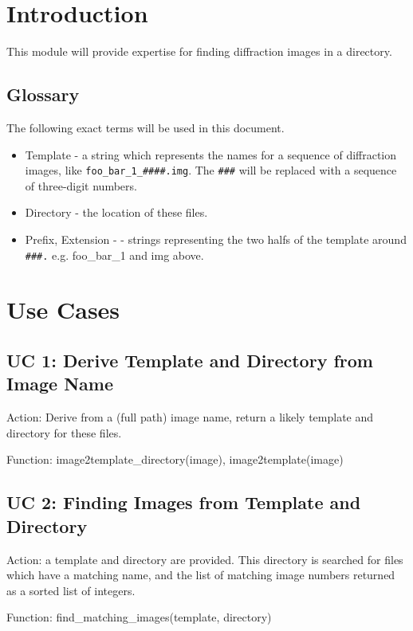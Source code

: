 \documentclass[a4paper, 11pt]{article}
\begin{document}
\section{Introduction}

This module will provide expertise for finding diffraction images in a
directory. 

\subsection{Glossary}

The following exact terms will be used in this document.

\begin{itemize}
\item{Template - a string which represents the names for a sequence of
diffraction images, like \verb|foo_bar_1_####.img|. The \verb|###| will
be replaced with a sequence of three-digit numbers.}
\item{Directory - the location of these files.}
\item{Prefix, Extension - - strings representing the two halfs of the 
template around \verb|###.| e.g. foo\_bar\_1 and img above.}
\end{itemize}

\section{Use Cases}

\subsection{UC 1: Derive Template and Directory from Image Name}

Action: Derive from a (full path) image name, return a likely template and
directory for these files. 

Function: image2template\_directory(image), image2template(image)

\subsection{UC 2: Finding Images from Template and Directory}

Action: a template and directory are provided. This directory is searched for
files which have a matching name, and the list of matching image numbers 
returned as a sorted list of integers.

Function: find\_matching\_images(template, directory)
\end{document}
